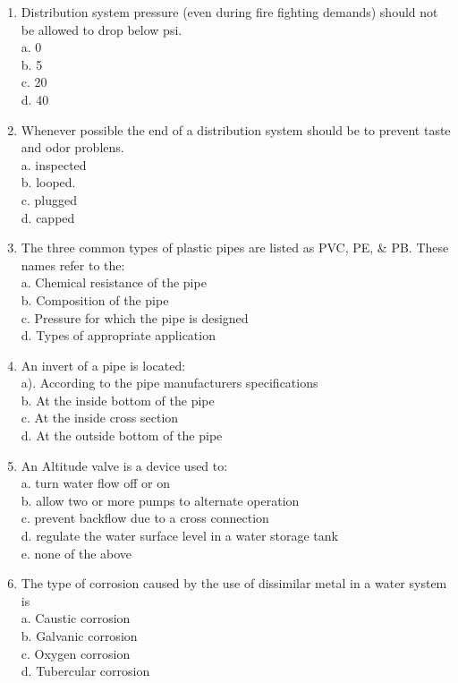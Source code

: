 \begin{enumerate}[1.]
\item Distribution system pressure (even during fire fighting demands) should not be allowed to drop below psi.\\
a. 0\\
b. 5\\
c. 20\\
d. 40\\

\item Whenever possible the end of a distribution system should be to prevent taste and odor problens.\\
a. inspected\\
b. looped.\\
c. plugged\\
d. capped\\

\item The three common types of plastic pipes are listed as PVC, PE, \& PB. These names refer to the:\\
a. Chemical resistance of the pipe\\
b. Composition of the pipe\\
c. Pressure for which the pipe is designed\\
d. Types of appropriate application\\

\item An invert of a pipe is located:\\
a). According to the pipe manufacturers specifications\\
b. At the inside bottom of the pipe\\
c. At the inside cross section\\
d. At the outside bottom of the pipe\\

\item An Altitude valve is a device used to:\\
a. turn water flow off or on\\
b. allow two or more pumps to alternate operation\\
c. prevent backflow due to a cross connection\\
d. regulate the water surface level in a water storage tank\\
e. none of the above\\


\item The type of corrosion caused by the use of dissimilar metal in a water system is\\
a. Caustic corrosion\\
b. Galvanic corrosion\\
c. Oxygen corrosion\\
d. Tubercular corrosion\\



\end{enumerate}

